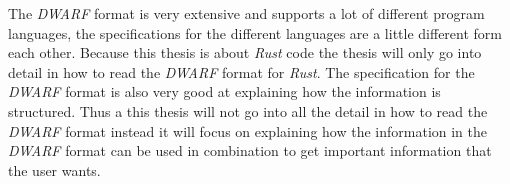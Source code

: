 The \emph{DWARF} format is very extensive and supports a lot of different program languages, the specifications for the different languages are a little different form each other.
Because this thesis is about \emph{Rust} code the thesis will only go into detail in how to read the \emph{DWARF} format for \emph{Rust}.
The specification for the \emph{DWARF} format is also very good at explaining how the information is structured.
Thus a this thesis will not go into all the detail in how to read the \emph{DWARF} format instead it will focus on explaining how the information in the \emph{DWARF} format can be used in combination to get important information that the user wants.


